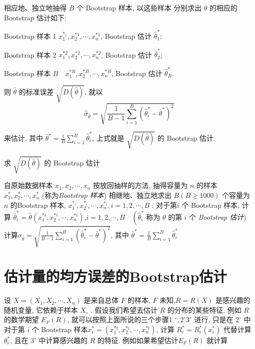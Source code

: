 相应地、独立地抽得 $ B $ 个 Bootstrap 样本, 以这些样本 分别求出 $ \theta $ 的相应的 Bootstrap 估计如下:

Bootstrap 样本 1 $ x_{1}^{*_{1}}, x_{2}^{* 1}, \cdots, x_{n}^{* 1} $, Bootstrap 估计 $ \hat{\theta}_{1}^{*} $;

Bootstrap 样本 2 $ x_{1}^{* 2}, x_{2}^{* 2}, \cdots, x_{n}^{* 2} $, Bootstrap 估计 $ \hat{\theta}_{2}^{*} $;

Bootstrap 样本 $ {B} \quad {x}_{1}^{* B}, {x}_{2}^{* B}, \cdots, {x}_{n}^{* B} $, Bootstrap 估计 $ \hat{\theta}_{B}^{*} $.

则 $ \hat{\theta} $ 的标准误差 $ \sqrt{D(\hat{\theta})} $, 就以
$$
\hat{\sigma}_{\hat{\theta}}=\sqrt{\frac{1}{B-1} \sum_{i=1}^{B}\left(\hat{\theta}_{i}^{*}-\bar{\theta}^{*}\right)^{2}}
$$

来估计, 其中 $ \bar{\theta}^{\star}=\frac{1}{B} \sum_{i=1}^{B} \hat{\theta}_{i}^{*} $, 上式就是 $ \sqrt{D(\hat{\theta})} $ 的 Bootstrap 估计. 

\begin{algorithm}
    \caption{求 $ \sqrt{D(\hat{\theta})} $ 的 Bootstrap 估计}
    自原始数据样本 $ x_{1}, x_{2}, \cdots, x_{n} $ 按放回抽样的方法, 抽得容量为 $ n $ 的样本 $ x_{1}^{*}, x_{2}^{*}, \cdots, x_{n}^{*} $ (称为\textit{Bootstrap 样本})\;
    相继地、独立地求出 $ B(B \geq 1000) $ 个容量为 $ n $ 的Bootstrap 样本, $ x_{1}^{*_{i}}, x_{2}^{*_{i}}, \cdots, x_{n}^{*_{i}}, {i}={1}, {2}, \cdots, {B} $ .  对于第$ {i} $ 个 Bootstrap 样本, 计算 $ \hat{\theta}_{i}^{*}=\hat{\theta}\left(x_{1}^{* i}, x_{2}^{* i}, \cdots, x_{n}^{* i}\right) $,$ {i}={1}, {2}, \cdots, B \quad\left(\hat{\theta}_{i}^{*}\right. $ 称为 $ \theta $ 的第 $ {i} $ 个 \textit{Bootstrap 估计})\;
    计算$ \hat{\sigma}_{\hat{\theta}}=\sqrt{\frac{1}{B-1} \sum_{i=1}^{B}\left(\hat{\theta}_{i}^{*}-\bar{\theta}^{*}\right)^{2}} $, 其中 $ \bar{\theta}^{*}=\frac{1}{B} \sum_{i=1}^{B} \hat{\theta}_{i}^{*} $
\end{algorithm}

\section{估计量的均方误差的Bootstrap估计}

设 $ X=\left(X_{1}, X_{2}, \cdots, X_{n}\right) $ 是来自总体 $ F $ 的样本, $ F $ 未知,$ {R}={R}({X}) $ 是感兴趣的随机变量, 它依赖于样本 $ {X}_{\circ} $ . 假设我们希望去估计 $ R $ 的分布的某些特征. 例如 $ R $ 的数学期望 $ E_{F}({R}) $, 就可以按照上面所说的三个步骤1 $ ^{\circ}, 2^{\circ} $$ 3^{\circ} $ 进行, 只是在 $ 2^{\circ} $ 中对于第 $ {i} $ 个 Bootstrap 样本$ {x}_{i}^{*}=\left(x_{1}^{* i}, x_{2}^{* i}, \cdots, x_{n}^{* i}\right) $, 计算 $ R_{i}^{*}=R_{i}^{*}\left(x_{i}^{*}\right) $ 代替计算 $ \theta_{i}^{*} $, 且在 $ 3^{\circ} $ 中计算感兴趣的 $ R $ 的特征. 例如如果希望估计$ {E}_{F}({R}) $ 就计算

